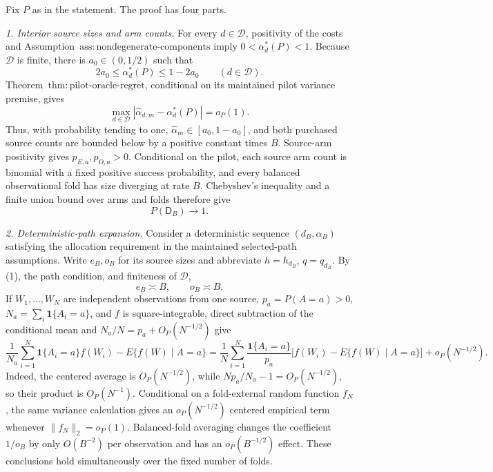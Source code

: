 Fix \(P\) as in the statement.  The proof has four parts.

\emph{1. Interior source sizes and arm counts.}
For every \(d\in\mathcal D\), positivity of the costs and Assumption~\(\mathrm{ass{:}nondegenerate\text{-}components}\) imply \(0<\alpha_d^*(P)<1\).  Because \(\mathcal D\) is finite, there is \(a_0\in(0,1/2)\) such that
\[
 2a_0\le \alpha_d^*(P)\le1-2a_0
 \qquad(d\in\mathcal D). \tag{1}
\]
Theorem~\(\mathrm{thm{:}pilot\text{-}oracle\text{-}regret}\), conditional on its maintained pilot variance premise, gives
\[
 \max_{d\in\mathcal D}
 |\widehat\alpha_{d,m}-\alpha_d^*(P)|=o_P(1). \tag{2}
\]
Thus, with probability tending to one, \(\widehat\alpha_m\in[a_0,1-a_0]\), and both purchased source counts are bounded below by a positive constant times \(B\).  Source-arm positivity gives \(p_{E,a},p_{O,a}>0\).  Conditional on the pilot, each source arm count is binomial with a fixed positive success probability, and every balanced observational fold has size diverging at rate \(B\).  Chebyshev's inequality and a finite union bound over arms and folds therefore give
\[
 P(\mathsf D_B)\longrightarrow1. \tag{3}
\]

\emph{2. Deterministic-path expansion.}
Consider a deterministic sequence \((d_B,\alpha_B)\) satisfying the allocation requirement in the maintained selected-path assumptions.  Write \(e_B,o_B\) for its source sizes and abbreviate \(h=h_{d_B}\), \(q=q_{d_B}\).  By (1), the path condition, and finiteness of \(\mathcal D\),
\[
 e_B\asymp B,\qquad o_B\asymp B. \tag{4}
\]
If \(W_1,\ldots,W_N\) are independent observations from one source, \(p_a=P(A=a)>0\), \(N_a=\sum_i\mathbf1\{A_i=a\}\), and \(f\) is square-integrable, direct subtraction of the conditional mean and \(N_a/N=p_a+O_P(N^{-1/2})\) give
\[
 \frac1{N_a}\sum_{i=1}^N\mathbf1\{A_i=a\}f(W_i)
 -E\{f(W)\mid A=a\}
 =\frac1N\sum_{i=1}^N\frac{\mathbf1\{A_i=a\}}{p_a}
 \bigl[f(W_i)-E\{f(W)\mid A=a\}\bigr]
 +o_P(N^{-1/2}). \tag{5}
\]
Indeed, the centered average is \(O_P(N^{-1/2})\), while \(Np_a/N_a-1=O_P(N^{-1/2})\), so their product is \(O_P(N^{-1})\).  Conditional on a fold-external random function \(f_N\), the same variance calculation gives an \(o_P(N^{-1/2})\) centered empirical term whenever \(\|f_N\|_2=o_P(1)\).  Balanced-fold averaging changes the coefficient \(1/o_B\) by only \(O(B^{-2})\) per observation and has an \(o_P(B^{-1/2})\) effect.  These conclusions hold simultaneously over the fixed number of folds.

